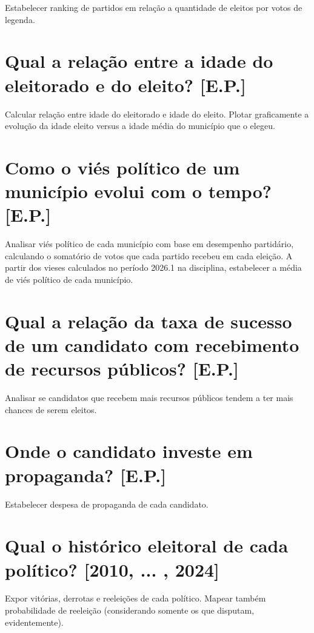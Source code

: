 Estabelecer ranking de partidos em relação a quantidade de eleitos por votos de legenda.

\section{Qual a relação entre a idade do eleitorado e do eleito? [E.P.]}

Calcular relação entre idade do eleitorado e idade do eleito. Plotar graficamente a evolução da idade eleito versus
a idade média do município que o elegeu.

\section{Como o viés político de um município evolui com o tempo? [E.P.]}

Analisar viés político de cada município com base em desempenho partidário, calculando
o somatório de votos que cada partido recebeu em cada eleição. A partir dos vieses calculados
no período 2026.1 na disciplina, estabelecer a média de viés político de cada município.

\section{Qual a relação da taxa de sucesso de um candidato com recebimento de recursos públicos? [E.P.]}

Analisar se candidatos que recebem mais recursos públicos tendem a ter mais chances de serem eleitos.

\section{Onde o candidato investe em propaganda? [E.P.]}

Estabelecer despesa de propaganda de cada candidato.

\section{Qual o histórico eleitoral de cada político? [2010, ... , 2024]}

Expor vitórias, derrotas e reeleições de cada político. Mapear também probabilidade de reeleição 
(considerando somente os que disputam, evidentemente).